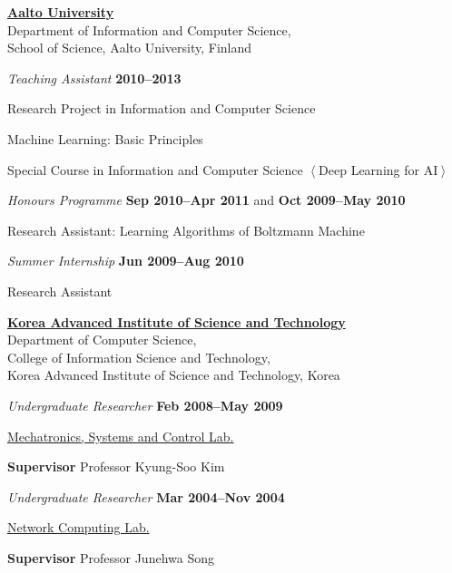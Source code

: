 \documentclass[10pt]{article}
\newenvironment{outerlist}[1][\enskip\textbullet]%
        {\begin{itemize}[#1]}{\end{itemize}%
         \vspace{-.6\baselineskip}}
\newenvironment{innerlist}[1][\enskip\textbullet]%
        {\begin{compactitem}[#1]}{\end{compactitem}}
\newcommand{\blankline}{\quad\pagebreak[2]}
\begin{document}
\href{http://ics.aalto.fi}{\textbf{Aalto University}} \\
Department of Information and Computer Science, \\
School of Science, Aalto University, Finland
\begin{outerlist}
\item[] \textit{Teaching Assistant}%
    \hfill \textbf{2010--2013}
    \begin{innerlist}
            \item Research Project in Information and Computer Science
            \item Machine Learning: Basic Principles
            \item Special Course in Information and Computer Science $\left<\right.$Deep Learning for AI$\left.\right>$
     \end{innerlist}

\item[] \textit{Honours Programme}%
    \hfill \textbf{Sep 2010--Apr 2011} and \textbf{Oct 2009--May 2010}
    \begin{innerlist}
            \item Research Assistant: Learning Algorithms of Boltzmann Machine
     \end{innerlist}

\item[] \textit{Summer Internship}%
    \hfill \textbf{Jun 2009--Aug 2010}
    \begin{innerlist}
            \item Research Assistant
     \end{innerlist}
\end{outerlist}

\blankline

\href{http://www.kaist.ac.kr}{\textbf{Korea Advanced Institute of Science and Technology}} \\
Department of Computer Science, \\
College of Information Science and Technology, \\
Korea Advanced Institute of Science and Technology, Korea
\begin{outerlist}

\item[] \textit{Undergraduate Researcher}
        \hfill \textbf{Feb 2008--May 2009}
    \begin{innerlist}
    \item \href{http://msc.kaist.ac.kr/}{Mechatronics, Systems and Control Lab.}
    \item \textbf{Supervisor} Professor Kyung-Soo Kim
    \end{innerlist}

\item[] \textit{Undergraduate Researcher}
        \hfill \textbf{Mar 2004--Nov 2004}
    \begin{innerlist}
    \item \href{http://nclab.kaist.ac.kr/}{Network Computing Lab.}
    \item \textbf{Supervisor} Professor Junehwa Song
    \end{innerlist}


\end{outerlist}
\end{document}
